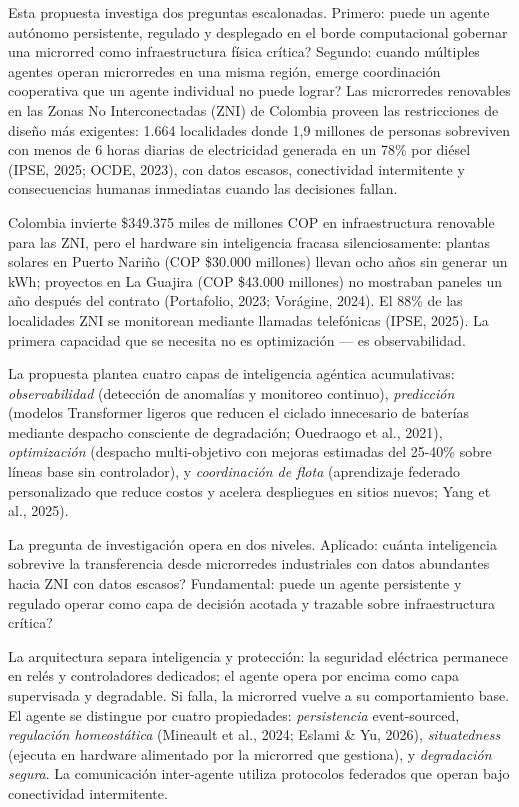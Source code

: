 \documentclass[12pt,letterpaper]{article}
\begin{document}
Esta propuesta investiga dos preguntas escalonadas. Primero: \textquestiondown puede un agente aut\'onomo persistente, regulado y desplegado en el borde computacional gobernar una microrred como infraestructura f\'isica cr\'itica? Segundo: cuando m\'ultiples agentes operan microrredes en una misma regi\'on, \textquestiondown emerge coordinaci\'on cooperativa que un agente individual no puede lograr? Las microrredes renovables en las Zonas No Interconectadas (ZNI) de Colombia proveen las restricciones de dise\~no m\'as exigentes: 1.664 localidades donde 1,9 millones de personas sobreviven con menos de 6 horas diarias de electricidad generada en un 78\% por di\'esel (IPSE, 2025; OCDE, 2023), con datos escasos, conectividad intermitente y consecuencias humanas inmediatas cuando las decisiones fallan.

Colombia invierte \$349.375 miles de millones COP en infraestructura renovable para las ZNI, pero el hardware sin inteligencia fracasa silenciosamente: plantas solares en Puerto Nari\~no (COP \$30.000 millones) llevan ocho a\~nos sin generar un kWh; proyectos en La Guajira (COP \$43.000 millones) no mostraban paneles un a\~no despu\'es del contrato (Portafolio, 2023; Vor\'agine, 2024). El 88\% de las localidades ZNI se monitorean mediante llamadas telef\'onicas (IPSE, 2025). La primera capacidad que se necesita no es optimizaci\'on --- es observabilidad.

La propuesta plantea cuatro capas de inteligencia ag\'entica acumulativas: \textit{observabilidad} (detecci\'on de anomal\'ias y monitoreo continuo), \textit{predicci\'on} (modelos Transformer ligeros que reducen el ciclado innecesario de bater\'ias mediante despacho consciente de degradaci\'on; Ouedraogo et al., 2021), \textit{optimizaci\'on} (despacho multi-objetivo con mejoras estimadas del 25-40\% sobre l\'ineas base sin controlador), y \textit{coordinaci\'on de flota} (aprendizaje federado personalizado que reduce costos y acelera despliegues en sitios nuevos; Yang et al., 2025).

La pregunta de investigaci\'on opera en dos niveles. Aplicado: \textquestiondown cu\'anta inteligencia sobrevive la transferencia desde microrredes industriales con datos abundantes hacia ZNI con datos escasos? Fundamental: \textquestiondown puede un agente persistente y regulado operar como capa de decisi\'on acotada y trazable sobre infraestructura cr\'itica?

La arquitectura separa inteligencia y protecci\'on: la seguridad el\'ectrica permanece en rel\'es y controladores dedicados; el agente opera por encima como capa supervisada y degradable. Si falla, la microrred vuelve a su comportamiento base. El agente se distingue por cuatro propiedades: \textit{persistencia} event-sourced, \textit{regulaci\'on homeost\'atica} (Mineault et al., 2024; Eslami \& Yu, 2026), \textit{situatedness} (ejecuta en hardware alimentado por la microrred que gestiona), y \textit{degradaci\'on segura}. La comunicaci\'on inter-agente utiliza protocolos federados que operan bajo conectividad intermitente.
\end{document}
